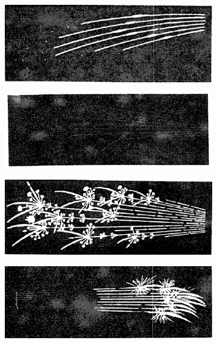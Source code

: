 \documentclass[12pt,a4paper]{article}
\begin{document}
\begin{figure}[h!]
\begin{subfigure}{0.45\textwidth}
        \includegraphics[width=\textwidth]{Figuras/Mo.png}
        \label{fig:Mo}
    \end{subfigure}
    \hfill
    \begin{subfigure}{0.45\textwidth}
        \centering
        \includegraphics[width=\textwidth]{Figuras/W.png}
        \label{fig:W}
    
        \includegraphics[width=\textwidth]{Figuras/troquel.png}
        \label{fig:troquel}
    
        \includegraphics[width=\textwidth]{Figuras/blanca.png}
        \label{fig:blanca}
    

\end{subfigure}
\end{figure}
\end{document}
